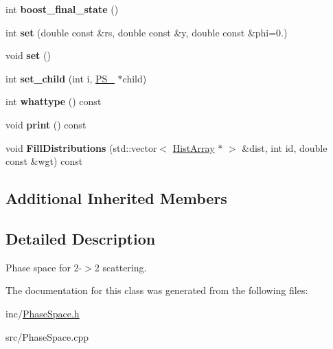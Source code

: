 \begin{DoxyCompactItemize}
\item 
\hypertarget{classPS__2__2_a397211db7a5b9781886cc55dae1d23d3}{int {\bfseries boost\-\_\-final\-\_\-state} ()}\label{classPS__2__2_a397211db7a5b9781886cc55dae1d23d3}

\item 
\hypertarget{classPS__2__2_add28db38c9779539849ecb4384432911}{int {\bfseries set} (double const \&rs, double const \&y, double const \&phi=0.)}\label{classPS__2__2_add28db38c9779539849ecb4384432911}

\item 
\hypertarget{classPS__2__2_ab111a119760dc14b3ae5cb40dbec0c49}{void {\bfseries set} ()}\label{classPS__2__2_ab111a119760dc14b3ae5cb40dbec0c49}

\item 
\hypertarget{classPS__2__2_a7ed4acdee85fea6b129aa9801cb8d3c7}{int {\bfseries set\-\_\-child} (int i, \hyperlink{classPS__2}{P\-S\-\_} $\ast$child)}\label{classPS__2__2_a7ed4acdee85fea6b129aa9801cb8d3c7}

\item 
\hypertarget{classPS__2__2_a27ba82e9c32ba391be7df643181de646}{int {\bfseries whattype} () const }\label{classPS__2__2_a27ba82e9c32ba391be7df643181de646}

\item 
\hypertarget{classPS__2__2_af19d44fe30fb72ccfc20f5626f04dcdc}{void {\bfseries print} () const }\label{classPS__2__2_af19d44fe30fb72ccfc20f5626f04dcdc}

\item 
\hypertarget{classPS__2__2_ad5cba45021b35d3586c40610d873d915}{void {\bfseries Fill\-Distributions} (std\-::vector$<$ \hyperlink{classHistArray}{Hist\-Array} $\ast$ $>$ \&dist, int id, double const \&wgt) const }\label{classPS__2__2_ad5cba45021b35d3586c40610d873d915}

\end{DoxyCompactItemize}
\subsection*{Additional Inherited Members}


\subsection{Detailed Description}
Phase space for 2-\/$>$2 scattering. 

The documentation for this class was generated from the following files\-:\begin{DoxyCompactItemize}
\item 
inc/\hyperlink{PhaseSpace_8h}{Phase\-Space.\-h}\item 
src/Phase\-Space.\-cpp\end{DoxyCompactItemize}
